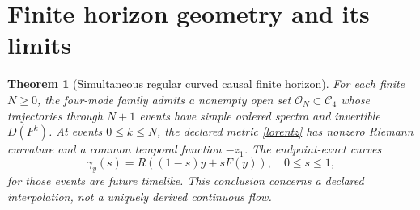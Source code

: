 \documentclass[11pt,letterpaper]{article}
\newtheorem{theorem}{Theorem}[section]
\theoremstyle{definition}
\numberwithin{equation}{section}
\begin{document}
\section{Finite horizon geometry and its limits}
\begin{theorem}[Simultaneous regular curved causal finite horizon]\label{finitegeom}
For each finite $N\geq0$, the four-mode family admits a nonempty open set $\mathcal O_N\subset\mathcal C_4$ whose trajectories through $N+1$ events have simple ordered spectra and invertible $D(F^k)$. At events $0\leq k\leq N$, the declared metric \eqref{lorentz} has nonzero Riemann curvature and a common temporal function $-z_1$. The endpoint-exact curves
\begin{equation}
\gamma_y(s)=R((1-s)y+sF(y)),\quad 0\leq s\leq1,
\end{equation}
for those events are future timelike. This conclusion concerns a declared interpolation, not a uniquely derived continuous flow.
\end{theorem}
\end{document}
